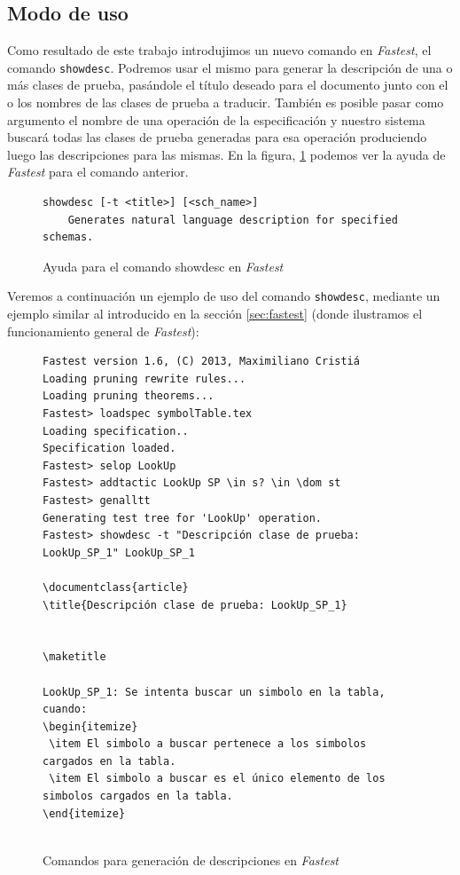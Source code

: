 \subsection{Modo de uso}

Como resultado de este trabajo introdujimos un nuevo comando en \textit{Fastest}, el comando \texttt{showdesc}. Podremos usar el mismo para generar la descripción de una o más clases de prueba, pasándole el título deseado para el documento junto con el o los nombres de las clases de prueba a traducir. También es posible pasar como argumento el nombre de una operación de la especificación y nuestro sistema buscará todas las clases de prueba generadas para esa operación produciendo luego las descripciones para las mismas. En la figura, \ref{ej:showdesc_fastest} podemos ver la ayuda de \textit{Fastest} para el comando anterior.

\begin{figure}[H]
\centering
\begin{Verbatim}[frame=single,fontsize=\scriptsize]
showdesc [-t <title>] [<sch_name>]
	Generates natural language description for specified schemas.
\end{Verbatim}
\caption{Ayuda para el comando showdesc en \emph{Fastest}}
\label{ej:showdesc_fastest}
\end{figure}

Veremos a continuación un ejemplo de uso del comando \texttt{showdesc}, mediante un ejemplo similar al introducido en la sección \ref{sec:fastest} (donde ilustramos el funcionamiento general de \textit{Fastest}):

\begin{figure}[H]
\centering
\begin{Verbatim}[frame=single,fontsize=\scriptsize]
Fastest version 1.6, (C) 2013, Maximiliano Cristiá
Loading pruning rewrite rules...
Loading pruning theorems...
Fastest> loadspec symbolTable.tex
Loading specification..
Specification loaded.
Fastest> selop LookUp
Fastest> addtactic LookUp SP \in s? \in \dom st      
Fastest> genalltt
Generating test tree for 'LookUp' operation.
Fastest> showdesc -t "Descripción clase de prueba: LookUp_SP_1" LookUp_SP_1 

\documentclass{article}
\title{Descripción clase de prueba: LookUp_SP_1}


\maketitle

LookUp_SP_1: Se intenta buscar un simbolo en la tabla, cuando:
\begin{itemize}
 \item El simbolo a buscar pertenece a los simbolos cargados en la tabla.
 \item El simbolo a buscar es el único elemento de los simbolos cargados en la tabla.
\end{itemize}


\end{Verbatim}
\caption{Comandos para generación de descripciones en \emph{Fastest}}
\label{ej:comandos_fastest_nlg}
\end{figure}


